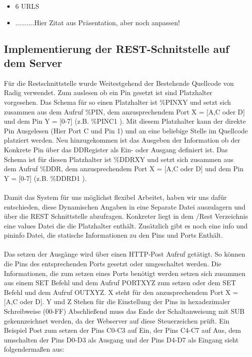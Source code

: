 \begin{itemize}
	\item 6 URLS
	\item ..........Hier Zitat aus Präsentation, aber noch anpassen!
\end{itemize}
	
\subsection{Implementierung der REST-Schnitstelle auf dem Server}

Für die Restschnittstelle wurde Weitestgehend der Bestehende Quellcode von Radig
verwendet. Zum auslesen ob ein Pin gesetzt ist sind Platzhalter vorgesehen.
Das Schema für so einen Platzhalter ist \textrm{\%PINXY} und setzt sich zusammen aus dem
Aufruf \textrm{\%PIN}, dem anzusprechendem Port X = [A,C oder D] und dem Pin Y = [0-7] (z.B.
\textrm{\%PINC1 } ). Mit diesem Platzhalter kann der direkte Pin Ausgelesen
(Hier Port C und Pin 1) und an eine beliebige Stelle im Quellcode platziert werden. Neu
hinzugekommen ist das Ausgeben der Information ob der Konkrete Pin über das
DDRegister als Ein- oder Ausgang definiert ist. Das Schema ist für diesen
Platzhalter ist \textrm{\%DDRXY} und setzt sich zusammen aus dem Aufruf \textrm{\%DDR}, dem
anzusprechendem Port X = [A,C oder D] und dem Pin Y = [0-7] (z.B.
\textrm{\%DDRD1} ). \\
\\
Damit das System für uns möglichst flexibel Arbeitet, haben wir uns dafür
entschieden, diese Dynamischen Angaben in eine Separate Datei auszulagern und
über die REST Schnittstelle abzufragen. Konkreter liegt in dem /Rest
Verzeichnis eine \textrm{values} Datei die die Platzhalter enthält. Zusätzlich
gibt es noch eine \textrm{info} und \textrm{pininfo} Datei, die statische
Informationen zu den Pins und Ports Enthält. \\
\\
Das setzen der Ausgänge wird über einen HTTP-Post Aufruf getätigt. So können die
Pins des entsprechenden Ports gesetzt oder umgeschaltet werden. Die
Informationen, die zum setzen eines Ports benötigt werden setzen sich zusammen
aus einem \textrm{SET} Befehl und dem Aufruf PORTXYZ zum setzen oder dem
\textrm{SET} Befehl und dem Aufruf OUTXYZ. X steht für den anzusprechendem Port
X = [A,C oder D]. Y und Z Stehen für die Einstellung der Pins in hexadezimaler
Schreibweise (00-FF) Abschließend muss das Ende der Schaltanweisung mit
\textrm{SUB} gekennzeichnet werden, da der Webserver auf diese Steuerzeichen
prüft. Ein Beispiel Post zum setzen der Pins C0-C3 auf Ein, der Pins C4-C7 auf
Aus, dem umschalten der Pins D0-D3 als Ausgang und der Pins D4-D7 als Eingang
sieht folgendermaßen aus:
\\


